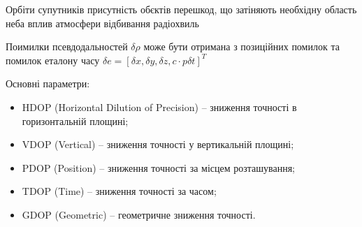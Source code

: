 Орбіти супутників
присутність обєктів перешкод, що затіняють необхідну область неба
вплив атмосфери
відбивання радіохвиль

Поимилки псевдодальностей $ \delta\rho $ може бути отримана з позиційних помилок 
 та помилок еталону часу $\delta e =[\delta x, \delta y, \delta z, c\cdot p\delta t]^T $
% 
% 



Основні параметри:
\begin{itemize}
 \item HDOP (Horizontal Dilution of Precision) -- зниження точності в горизонтальній площині;
 \item VDOP (Vertical) -- зниження точності у вертикальній площині;
 \item PDOP (Position) -- зниження точності за місцем розташування;
 \item TDOP (Time) -- зниження точності за часом;
 \item GDOP (Geometric) -- геометричне зниження точності.
\end{itemize}


